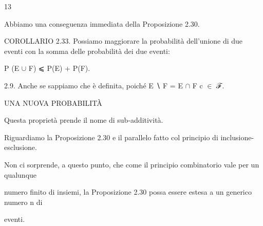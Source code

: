 \documentclass[a4paper,portrait,12pt]{article}
\begin{document}
13





\begin{flushleft}
Abbiamo una conseguenza immediata della Proposizione 2.30.
\end{flushleft}


\begin{flushleft}
COROLLARIO 2.33. Possiamo maggiorare la probabilit\`{a} dell'unione di due eventi con la somma delle probabilit\`{a} dei due eventi:
\end{flushleft}


\begin{flushleft}
P (E $\cup$ F) ⩽ P(E) + P(F).
\end{flushleft}


\begin{flushleft}
2.9. Anche se sappiamo che \`{e} definita, poich\'{e} E ∖ F = E $\cap$ F c $\in$ ℱ.
\end{flushleft}










\begin{flushleft}
UNA NUOVA PROBABILIT\`{A}
\end{flushleft}





\begin{flushleft}
Questa propriet\`{a} prende il nome di sub-additivit\`{a}.
\end{flushleft}


\begin{flushleft}
Riguardiamo la Proposizione 2.30 e il parallelo fatto col principio di inclusione-esclusione.
\end{flushleft}


\begin{flushleft}
Non ci sorprende, a questo punto, che come il principio combinatorio vale per un qualunque
\end{flushleft}


\begin{flushleft}
numero finito di insiemi, la Proposizione 2.30 possa essere estesa a un generico numero n di
\end{flushleft}


\begin{flushleft}
eventi.
\end{flushleft}
\end{document}
